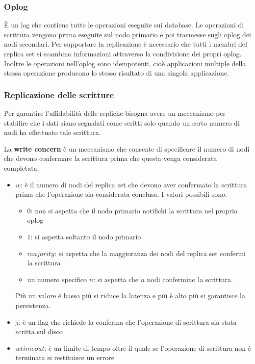 \documentclass[a4paper]{article}
\begin{document}
\subsubsection{Oplog}
È un log che contiene tutte le operazioni eseguite sui database. Le operazioni di
scrittura vengono prima eseguite sul nodo primario e poi trasmesse sugli oplog
dei nodi secondari. Per supportare la replicazione è necessario che tutti i membri
del replica set si scambino informazioni attraverso la condivisione dei propri oplog.
Inoltre le operazioni nell'oplog sono idempotenti, cioè applicazioni multiple della
stessa operazione producono lo stesso risultato di una singola applicazione.

\subsubsection{Replicazione delle scritture}
Per garantire l'affidabilità delle repliche bisogna avere un meccanismo per stabilire
che i dati siano segnalati come scritti solo quando un certo numero di nodi 
ha effettuato tale scrittura.

\vspace{1em}
\noindent
La \textbf{write concern} è un meccanismo che consente di specificare il numero di nodi
che devono confermare la scrittura prima che questa venga considerata completata.
\begin{itemize}
  \item \( w \): è il numero di nodi del replica set che devono aver confermato
    la scrittura prima che l'operazione sia considerata conclusa. I valori possibili
    sono:
    \begin{itemize}
      \item \( 0 \): non si aspetta che il nodo primario notifichi la scrittura nel
        proprio oplog

      \item \( 1 \): si aspetta soltanto il nodo primario

      \item \( majority \): si aspetta che la maggioranza dei nodi del replica set
        confermi la scrittura

      \item un numero specifico \( n \): si aspetta che \( n \) nodi confermino la
        scrittura.
    \end{itemize}
   Più un valore è basso più si riduce la latenza e più è alto più si garantisce la
   persistenza.

 \item \( j \): è un flag che richiede la conferma che l'operazione di scrittura sia
   stata scritta sul disco

 \item \( wtimeout \): è un limite di tempo oltre il quale se l'operazione di scrittura
   non è terminata si restituisce un errore
\end{itemize}
\end{document}

